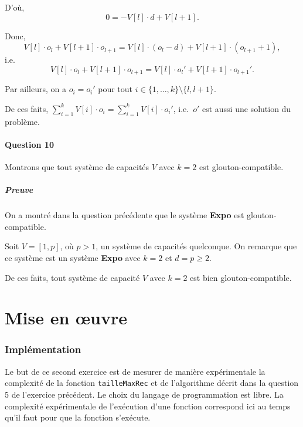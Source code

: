 \documentclass[12pt,a4paper]{article}
\begin{document}
\begin{enumerate}[a)]
 D'o\`u, 
 \begin{equation*}
    0 = -V[l]\cdot d + V[l+1].
 \end{equation*}
 
 Donc, 
 \begin{equation*}
    V[l]\cdot o_l + V[l+1]\cdot o_{l+1} = V[l]\cdot (o_l-d) + V[l+1]\cdot (o_{l+1} + 1),
 \end{equation*}
 i.e.\ 
 \begin{equation*}
    V[l]\cdot o_l + V[l+1]\cdot o_{l+1} = V[l]\cdot o_l' + V[l+1]\cdot o_{l+1}'.
 \end{equation*}
  
  Par ailleurs, on a $o_i = o_i' $ pour tout $i \in \{1, \dotsc, k\}\setminus \{ l,l+1 \}$. 
  
  De ces faits, \( \displaystyle\sum_{i=1}^{k} V[i]\cdot o_i = \displaystyle\sum_{i=1}^{k} V[i]\cdot o_i'\), i.e.\ $o'$ est aussi une solution du probl\`eme. 
\end{enumerate}

\subsection*{Question 10}
 Montrons que tout syst\`eme de capacit\'es $V$ avec $k = 2$ est glouton-compatible.

 \subsubsection*{Preuve}
 On a montr\'e dans la question pr\'ec\'edente que le syst\`eme {\bfseries Expo} est glouton-compatible.

 Soit $V = [1, p]$, o\`u $p > 1$, un syst\`eme de capacit\'es quelconque. On remarque que ce syst\`eme est un syst\`eme {\bfseries Expo} avec $k = 2$ et $d = p \geq 2$.

 De ces faits, tout syst\`eme de capacit\'e $V$ avec $k = 2$ est bien glouton-compatible.

\newpage
\part{Mise en \oe uvre}

\section{Impl\'ementation}
Le but de ce second exercice est de mesurer de mani\`ere exp\'erimentale la complexit\'e de la fonction \texttt{tailleMaxRec} et de l'algorithme d\'ecrit dans la question 5 de l'exercice pr\'ec\'edent. Le choix du langage de programmation est libre. La complexit\'e exp\'erimentale de l'ex\'ecution d'une fonction correspond ici au temps qu'il faut pour que la fonction s'ex\'ecute.
\end{document}
